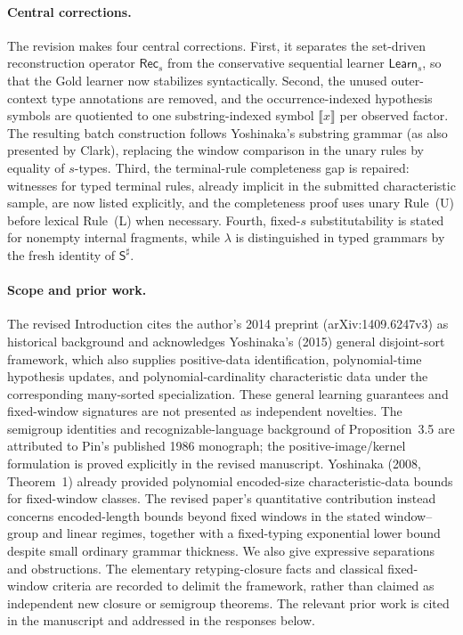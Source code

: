 \documentclass[
  10pt,
  a4paper,
]{article}
\newcommand{\NT}[1]{\llbracket #1\rrbracket}
\begin{document}
\paragraph{Central corrections.}
The revision makes four central corrections.  First, it separates the
set-driven reconstruction operator $\mathsf{Rec}_s$ from the conservative
sequential learner $\mathsf{Learn}_s$, so that the Gold learner now stabilizes
syntactically.  Second, the unused outer-context type annotations are removed,
and the occurrence-indexed hypothesis symbols are quotiented to one
substring-indexed symbol $\NT{x}$ per observed factor.  The resulting batch construction follows Yoshinaka's substring grammar
(as also presented by Clark), replacing the window comparison in the
unary rules by equality of $s$-types.  Third, the terminal-rule completeness gap is repaired: witnesses for
typed terminal rules, already implicit in the submitted characteristic
sample, are now listed explicitly, and the completeness proof uses
unary Rule~\textup{(U)} before lexical Rule~\textup{(L)} when necessary.  Fourth, fixed-$s$ substitutability is stated for nonempty internal
fragments, while $\lambda$ is distinguished in typed grammars
by the fresh identity of $\mathsf S^\sharp$.

\paragraph{Scope and prior work.}
The revised Introduction cites the author's 2014 preprint
(arXiv:1409.6247v3) as historical background and acknowledges
Yoshinaka's (2015) general disjoint-sort framework, which also
supplies positive-data identification, polynomial-time hypothesis updates,
and polynomial-cardinality characteristic data under the corresponding
many-sorted specialization. These general learning guarantees and
fixed-window signatures are not presented as independent novelties.
The semigroup identities and recognizable-language background of
Proposition~3.5 are attributed to Pin's published 1986 monograph;
the positive-image/kernel formulation is proved explicitly in the
revised manuscript.
Yoshinaka (2008, Theorem~1) already provided polynomial
encoded-size characteristic-data bounds for fixed-window classes.
The revised paper's quantitative contribution instead concerns
encoded-length bounds beyond fixed windows in the stated
window--group and linear regimes, together with a fixed-typing
exponential lower bound despite small ordinary grammar thickness.
We also give expressive separations and obstructions.
The elementary retyping-closure facts and classical fixed-window
criteria are recorded to delimit the framework, rather than
claimed as independent new closure or semigroup theorems.
The relevant prior work is cited in the manuscript and addressed
in the responses below.
\end{document}

